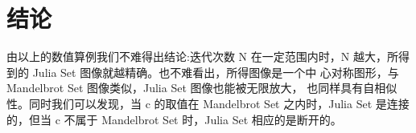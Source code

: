 \section{结论}
由以上的数值算例我们不难得出结论:迭代次数 N 在一定范围内时，N 越大，所得到的 Julia Set 图像就越精确。也不难看出，所得图像是一个中 心对称图形，与 Mandelbrot Set 图像类似，Julia Set 图像也能被无限放大， 也同样具有自相似性。同时我们可以发现，当 c 的取值在 Mandelbrot Set 之内时，Julia Set 是连接的，但当 c 不属于 Mandelbrot Set 时，Julia Set 相应的是断开的。